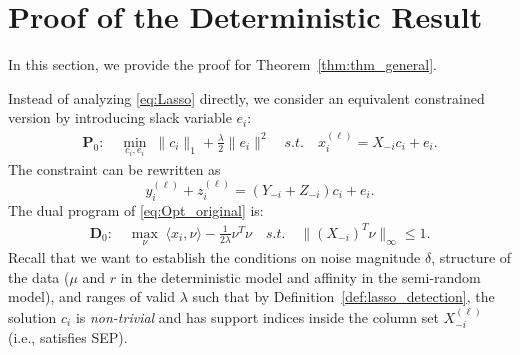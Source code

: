 \documentclass[twoside,11pt]{article}
\numberwithin{equation}{section}
\begin{document}
\section{Proof of the Deterministic Result}\label{sec:proof_deterministic}
In this section, we provide the proof for Theorem~\ref{thm:thm_general}.


Instead of analyzing \eqref{eq:Lasso} directly, we consider an equivalent constrained version by introducing slack variable $e_i$:
\begin{equation}\label{eq:Opt_original}
\begin{aligned}
\mathbf{P}_0:\quad \min_{c_i, e_i} \; \|c_i\|_1+\frac{\lambda}{2}\|e_i\|^2 \quad
s.t. \quad x^{(\ell)}_i=X_{-i}c_i+e_i.
\end{aligned}
\end{equation}
The constraint can be rewritten as
\begin{equation}\label{eq:Opt_original_equi}
y^{(\ell)}_i+z^{(\ell)}_i=(Y_{-i}+Z_{-i})c_i+e_i.
\end{equation}
The dual program of \eqref{eq:Opt_original} is:
\begin{equation}\label{eq:Opt_original_dual}
\begin{aligned}
\mathbf{D}_0:\quad \max_{\nu} \; \langle x_i,\nu \rangle - \frac{1}{2\lambda}\nu^T\nu \quad
s.t. \quad \|(X_{-i})^T\nu\|_{\infty} \leq 1.
\end{aligned}
\end{equation}
Recall that we want to establish the conditions on noise magnitude $\delta$, structure of the data ($\mu$ and $r$ in the deterministic model and affinity in the semi-random model), and ranges of valid $\lambda$ such that by Definition~\ref{def:lasso_detection}, the solution $c_i$ is \emph{non-trivial} and has support indices inside the column set $X^{(\ell)}_{-i}$ (i.e., satisfies SEP).


\end{document}
